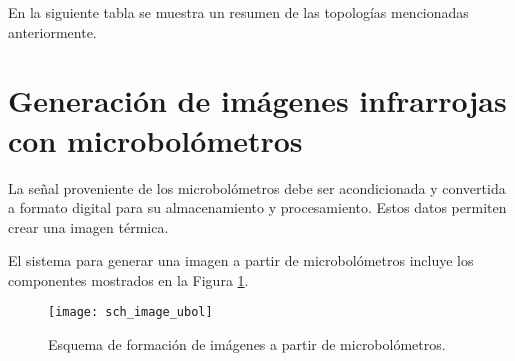 En la siguiente tabla se muestra un resumen de las topologías mencionadas anteriormente.
            \begin{table}[hbtp]
                \caption{Topologías ROIC.}
                \begin{center}
                \label{tab:Div_IR}
                \end{center}
            \end{table}
            
\newpage            
\section{Generación de imágenes infrarrojas con microbolómetros}            
La señal proveniente de los microbolómetros debe ser acondicionada y convertida a formato digital para su almacenamiento y procesamiento. Estos datos permiten crear una imagen térmica\cite{Moreno2022}.


El sistema para generar una imagen a partir de microbolómetros incluye los componentes mostrados en la Figura \ref{fig:sch_image_ubol}.

            \begin{figure}[hbtp]
                \centering
                \texttt{[image: sch\_image\_ubol]}
                \caption{Esquema de formación de imágenes a partir de microbolómetros.}
                \label{fig:sch_image_ubol}
            \end{figure} 

